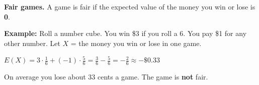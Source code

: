 \documentclass[11pt]{article}
\begin{document}
\vspace{1em}
\textbf{Fair games.} A game is fair if the expected value of the money you win or lose is \textbf{0}.

\vspace{0.2em}
\textbf{Example:} Roll a number cube. You win \$3 if you roll a 6. You pay \$1 for any other number. Let $X$ = the money you win or lose in one game.

\vspace{0.2em}
$E(X) = 3 \cdot \frac{1}{6} + (-1) \cdot \frac{5}{6} = \frac{3}{6} - \frac{5}{6} = -\frac{2}{6} \approx -\$0.33$

\vspace{0.2em}
On average you lose about 33 cents a game. The game is \textbf{not} fair.

\partner
\end{document}
